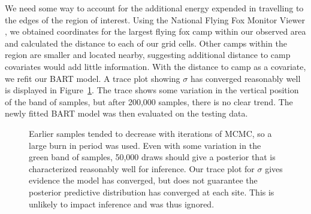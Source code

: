 \documentclass[
  12pt,
  letterpaper,
  DIV=11,
  numbers=noendperiod]{scrartcl}
\begin{document}
We need some way to account for the additional energy expended in
travelling to the edges of the region of interest. Using the National
Flying Fox Monitor Viewer \citep{ff_view}, we obtained coordinates for
the largest flying fox camp within our observed area and calculated the
distance to each of our grid cells. Other camps within the region are
smaller and located nearby, suggesting additional distance to camp
covariates would add little information. With the distance to camp as a
covariate, we refit our BART model. A trace plot showing \(\sigma\) has
converged reasonably well is displayed in Figure~\ref{fig-trace}. The
trace shows some variation in the vertical position of the band of
samples, but after 200,000 samples, there is no clear trend. The newly
fitted BART model was then evaluated on the testing data.

\begin{figure}[H]


\caption{\label{fig-trace}Earlier samples tended to decrease with
iterations of MCMC, so a large burn in period was used. Even with some
variation in the green band of samples, 50,000 draws should give a
posterior that is characterized reasonably well for inference. Our trace
plot for \(\sigma\) gives evidence the model has converged, but does not
guarantee the posterior predictive distribution has converged at each
site. This is unlikely to impact inference and was thus ignored.}

\end{figure}%
\end{document}
